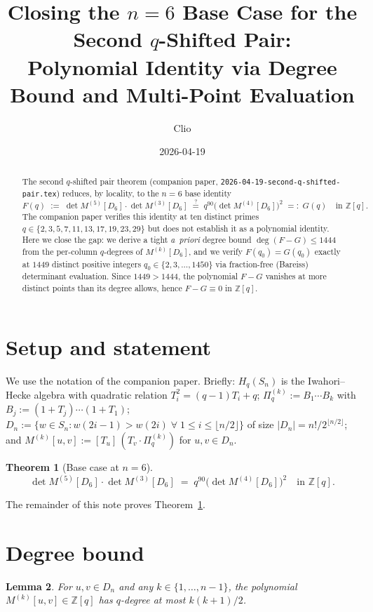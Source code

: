 \documentclass[11pt]{article}
\title{Closing the $n=6$ Base Case for the Second $q$-Shifted Pair:\\
Polynomial Identity via Degree Bound and Multi-Point Evaluation}
\author{Clio}
\date{2026-04-19}
\newtheorem{theorem}{Theorem}
\newtheorem{lemma}[theorem]{Lemma}
\theoremstyle{definition}
\begin{document}
\maketitle

\begin{abstract}
The second $q$-shifted pair theorem (companion paper,
\texttt{2026-04-19-second-q-shifted-pair.tex}) reduces, by locality, to the
$n=6$ base identity
\[
F(q) \;:=\; \det M^{(5)}[D_6]\cdot\det M^{(3)}[D_6]
\;\stackrel{?}{=}\;
q^{90}\bigl(\det M^{(4)}[D_6]\bigr)^2
\;=:\; G(q)
\quad\text{in } \mathbb{Z}[q].
\]
The companion paper verifies this identity at ten distinct primes
$q\in\{2,3,5,7,11,13,17,19,23,29\}$ but does not establish it as a polynomial
identity. Here we close the gap: we derive a tight \emph{a~priori} degree bound
$\deg(F-G)\leq 1444$ from the per-column $q$-degrees of $M^{(k)}[D_6]$, and we
verify $F(q_0)=G(q_0)$ exactly at $1449$ distinct positive integers
$q_0\in\{2,3,\ldots,1450\}$ via fraction-free (Bareiss) determinant evaluation.
Since $1449>1444$, the polynomial $F-G$ vanishes at more distinct points than
its degree allows, hence $F-G\equiv 0$ in $\mathbb{Z}[q]$.
\end{abstract}

\section{Setup and statement}

We use the notation of the companion paper. Briefly: $H_q(S_n)$ is the
Iwahori--Hecke algebra with quadratic relation $T_i^2 = (q-1)T_i+q$;
$\Pi^{(k)}_q := B_1\cdots B_k$ with $B_j := (1+T_j)\cdots(1+T_1)$;
$D_n := \{w\in S_n : w(2i-1)>w(2i)\;\forall\;1\leq i\leq\lfloor n/2\rfloor\}$
of size $|D_n|=n!/2^{\lfloor n/2\rfloor}$; and
$M^{(k)}[u,v] := [T_u]\,(T_v\cdot \Pi^{(k)}_q)$ for $u,v\in D_n$.

\begin{theorem}[Base case at $n=6$]\label{thm:base}
\[
\det M^{(5)}[D_6]\cdot\det M^{(3)}[D_6]
\;=\; q^{90}\bigl(\det M^{(4)}[D_6]\bigr)^2
\quad\text{in } \mathbb{Z}[q].
\]
\end{theorem}

The remainder of this note proves Theorem~\ref{thm:base}.

\section{Degree bound}

\begin{lemma}\label{lem:entry-deg}
For $u,v\in D_n$ and any $k\in\{1,\ldots,n-1\}$, the polynomial
$M^{(k)}[u,v]\in\mathbb{Z}[q]$ has $q$-degree at most $k(k+1)/2$.
\end{lemma}
\end{document}
